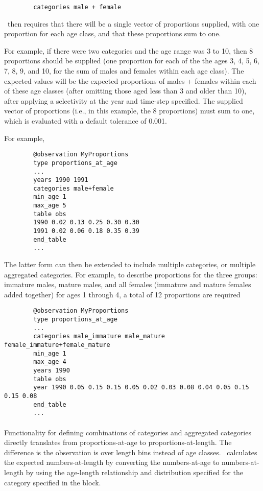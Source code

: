 {\small{\begin{verbatim}
		categories male + female
		\end{verbatim}}}

\CNAME\ then requires that there will be a single vector of proportions supplied, with one proportion for each age class, and that these proportions sum to one.

For example, if there were two categories and the age range was 3 to 10, then 8 proportions should be supplied (one proportion for each of the the ages 3, 4, 5, 6, 7, 8, 9, and 10, for the sum of males and females within each age class). The expected values will be the expected proportions of males + females within each of these age classes (after omitting those aged less than 3 and older than 10), after applying a selectivity at the year and time-step specified. The supplied vector of proportions (i.e., in this example, the 8 proportions) must sum to one, which is evaluated with a default tolerance of 0.001.

For example,

{\small{\begin{verbatim}
		@observation MyProportions
		type proportions_at_age
		...
		years 1990 1991
		categories male+female
		min_age 1
		max_age 5
		table obs
		1990 0.02 0.13 0.25 0.30 0.30
		1991 0.02 0.06 0.18 0.35 0.39
		end_table
		...
		\end{verbatim}}}

The latter form can then be extended to include multiple categories, or multiple aggregated categories. For example, to describe proportions for the three groups: immature males, mature males, and all females (immature and mature females added together) for ages 1 through 4, a total of 12 proportions are required

{\small{\begin{verbatim}
		@observation MyProportions
		type proportions_at_age
		...
		categories male_immature male_mature female_immature+female_mature
		min_age 1
		max_age 4
		years 1990
		table obs
		year 1990 0.05 0.15 0.15 0.05 0.02 0.03 0.08 0.04 0.05 0.15 0.15 0.08
		end_table
		...
		\end{verbatim}}}

\paragraph*{}\label{sec:Observation-ProportionsAtLength}

Functionality for defining combinations of categories and aggregated categories directly translates from proportions-at-age to proportions-at-length. The difference is the observation is over length bins instead of age classes. \CNAME\ calculates the expected numbers-at-length by converting the numbers-at-age to numbers-at-length by using the age-length relationship and distribution specified for the category specified in the  block.

